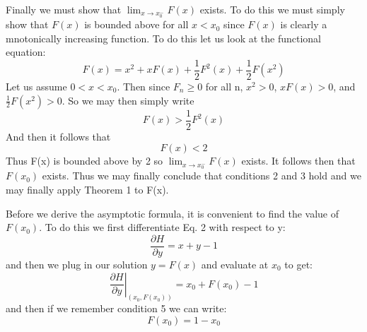 \documentclass{article}
\begin{document}
 Finally we must show that \(\lim_{x\to x_0^-}F(x)\) exists. To do this we must simply show that \(F(x)\) is bounded above for all \(x<x_0\) since \(F(x)\) is clearly a mnotonically increasing function. To do this let us look at the functional equation:
\begin{equation}
F(x)=x^2+ xF(x)+\frac{1}{2}F^2(x)+\frac{1}{2}F(x^2)
\end{equation}
Let us assume \(0<x<x_0\). Then since \(F_n \geq 0\) for all n, \(x^2>0\), \(xF(x)>0\), and \(\frac{1}{2}F(x^2)>0\). So we may then simply write
\begin{equation}
F(x)>\frac{1}{2}F^2(x)
\end{equation}
And then it follows that
\begin{equation}
F(x)<2
\end{equation}
Thus F(x) is bounded above by 2 so  \(\lim_{x\to x_0^-}F(x)\) exists. It follows then that \(F(x_0)\) exists. Thus we may finally conclude that conditions 2 and 3 hold and we may finally apply Theorem 1 to F(x).

Before we derive the asymptotic formula, it is convenient to find the value of \( F(x_0)\). To do this we first differentiate Eq. 2 with respect to y:
\begin{equation}
\frac{\partial H}{\partial y} = x+y-1
\end{equation}
and then we plug in our solution \(y=F(x)\) and evaluate at \(x_0\) to get:
\begin{equation}
\left.\frac{\partial H}{\partial y}\right|_{(x_0,F(x_0))} = x_0+F(x_0)-1
\end{equation}
and then if we remember condition 5 we can write:
\begin{equation}
F(x_0)=1-x_0
\end{equation}
\end{document}
